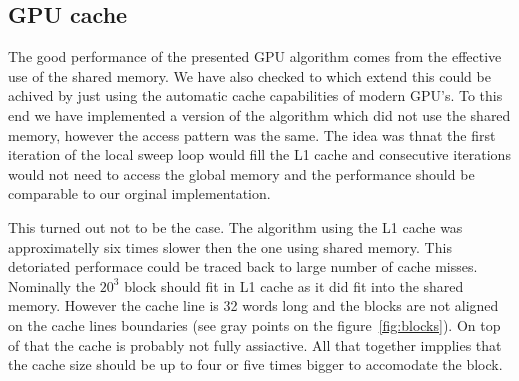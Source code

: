 \documentclass[a4paper]{llncs}
\begin{document}

\subsection{GPU cache}

The good performance of the presented GPU algorithm comes from the
effective use of the shared memory. We have also checked to which
extend this could be achived by just using the automatic cache
capabilities of modern GPU's. To this end we have implemented a
version of the algorithm which did not use the shared memory, however
the access pattern was the same. The idea was thnat the first
iteration of the local sweep loop would fill the L1 cache and
consecutive iterations would not need to access the global memory and the performance should be comparable to our orginal implementation. 

This turned out not to be the case. The algorithm using the L1 cache
was approximatelly six times slower then the one using shared
memory. This detoriated performace could be traced back to large
number of cache misses. Nominally the $20^3$ block should fit in L1
cache as it did fit into the shared memory. However the cache line is
32 words long and the blocks are not aligned on the cache lines
boundaries (see gray points on the figure~\ref{fig:blocks}). On top of
that the cache is probably not fully assiactive. All that together
impplies that the cache size should be up to four or five times bigger
to accomodate the block. 
\end{document}
